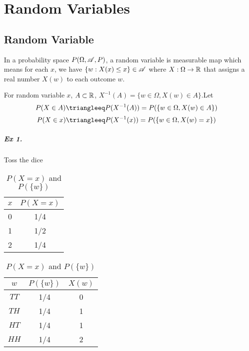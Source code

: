 \chapter{Random Variables}

\section{Random Variable}
\begin{definition}
	In a probability space $P(\Omega, \mathscr{A}, P)$, a random variable is measurable map which means for each $x$, we have $\{w:X(x)\leq x\}\in \mathscr{A}$ where $X:\Omega\to \mathbb{R}$ that assigns a real number $X(w)$ to each outcome $w$.
\end{definition}

\begin{definition}
	For random variable $x$, $A\subset \mathbb{R}$, $X^{-1}(A)=\{w\in\Omega, X(w)\in A\}$.Let
	$$P(X\in A)\triangleeq P(X^{-1}(A))=P(\{w\in\Omega, X(w)\in A\})$$
	$$P(X\in x)\triangleeq P(X^{-1}(x))=P(\{w\in\Omega, X(w)=x\})$$
\end{definition}

\paragraph{Ex 1.} Toss the dice

\begin{table}[H]
	\begin{minipage}{0.48\linewidth}
			\centering
			\begin{tabular}{c|c}
				\toprule[2pt]
				$x$ & $P(X=x)$ \\ \midrule[1pt]
				0 & 1/4\\
				1 & 1/2\\
				2 & 1/4\\
				\bottomrule[2pt]
			\end{tabular}
	\end{minipage}
	\begin{minipage}{.48\linewidth}
			\centering
			\begin{tabular}{c|c|c}
				\toprule[2pt]
				$w$ & $P(\{w\})$ & $X(w)$ \\
				\midrule[1pt]
				$TT$ & 1/4 & 0\\
				$TH$ & 1/4 & 1\\
				$HT$ & 1/4 & 1\\
				$HH$ & 1/4 & 2\\
				\bottomrule[2pt]
			\end{tabular}
	\end{minipage}
	\caption{$P(X=x)$ and $P(\{w\})$}
	\label{zrotate}
\end{table}

